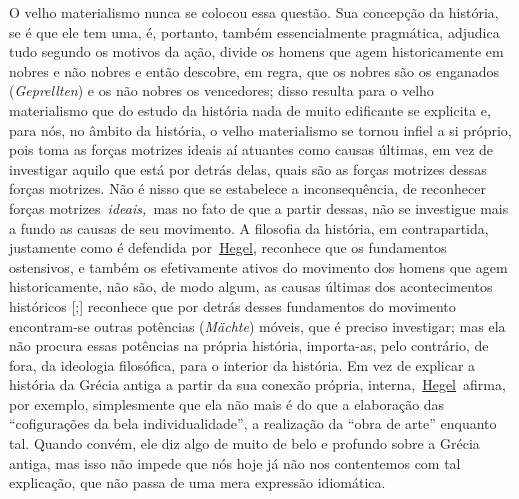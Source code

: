 O velho materialismo nunca se colocou essa questão. Sua concepção da
história, se é que ele tem uma, é, portanto, também essencialmente
pragmática, adjudica tudo segundo os motivos da ação, divide os homens
que agem historicamente em nobres e não nobres e então descobre, em
regra, que os nobres são os enganados (\emph{Geprellten}) e os não
nobres os vencedores; disso resulta para o velho materialismo que do
estudo da história nada de muito edificante se explicita e, para nós, no
âmbito da história, o velho materialismo se tornou infiel a si próprio,
pois toma as forças motrizes ideais aí atuantes como causas últimas, em
vez de investigar aquilo que está por detrás delas, quais são as forças
motrizes dessas forças motrizes. Não é nisso que se estabelece a
inconsequência, de reconhecer forças motrizes~\emph{ideais,~}mas no fato
de que a partir dessas, não se investigue mais a fundo as causas de seu
movimento. A filosofia da história, em contrapartida, justamente como é
defendida
por~\href{https://www.marxists.org/portugues/dicionario/verbetes/h/hegel.htm}{Hegel},
reconhece que os fundamentos ostensivos, e também os efetivamente ativos
do movimento dos homens que agem historicamente, não são, de modo algum,
as causas últimas dos acontecimentos históricos {[};{]} reconhece que
por detrás desses fundamentos do movimento encontram-se outras potências
(\emph{Mächte}) móveis, que é preciso investigar; mas ela não procura
essas potências na própria história, importa-as, pelo contrário, de
fora, da ideologia filosófica, para o interior da história. Em vez de
explicar a história da Grécia antiga a partir da sua conexão própria,
interna,~\href{https://www.marxists.org/portugues/dicionario/verbetes/h/hegel.htm}{Hegel}~afirma,
por exemplo, simplesmente que ela não mais é do que a elaboração das
``cofigurações da bela individualidade'', a realização da ``obra de
arte'' enquanto tal. Quando convém, ele diz algo de muito de belo e
profundo sobre a Grécia antiga, mas isso não impede que nós hoje já não
nos contentemos com tal explicação, que não passa de uma mera expressão
idiomática.

